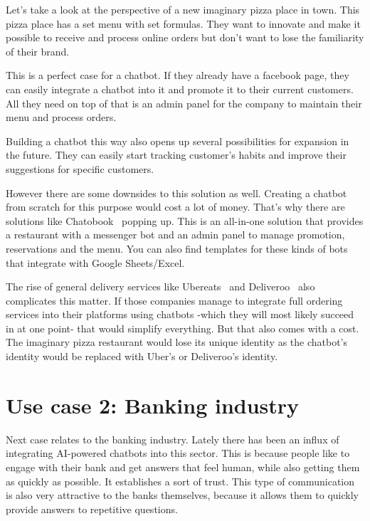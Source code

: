 Let's take a look at the perspective of a new imaginary pizza place in town. This pizza place has a set menu with set formulas. They want to innovate and make it possible to receive and process online orders but don't want to lose the familiarity of their brand.

This is a perfect case for a chatbot. If they already have a facebook page, they can easily integrate a chatbot into it and promote it to their current customers. All they need on top of that is an admin panel for the company to maintain their menu and process orders.

Building a chatbot this way also opens up several possibilities for expansion in the future. They can easily start tracking customer's habits and improve their suggestions for specific customers.

However there are some downsides to this solution as well. Creating a chatbot from scratch for this purpose would cost a lot of money. That's why there are solutions like Chatobook~\cite{chatobook} popping up. This is an all-in-one solution that provides a restaurant with a messenger bot and an admin panel to manage promotion, reservations and the menu. You can also find templates for these kinds of bots that integrate with Google Sheets/Excel.~\cite{chatbot-templates-pizza}

The rise of general delivery services like Ubereats~\cite{ubereats} and Deliveroo~\cite{deliveroo} also complicates this matter. If those companies manage to integrate full ordering services into their platforms using chatbots -which they will most likely succeed in at one point- that would simplify everything. But that also comes with a cost. The imaginary pizza restaurant would lose its unique identity as the chatbot's identity would be replaced with Uber's or Deliveroo's identity.

\section{Use case 2: Banking industry}

Next case relates to the banking industry. Lately there has been an influx of integrating AI-powered chatbots into this sector. This is because people like to engage with their bank and get answers that feel human, while also getting them as quickly as possible. It establishes a sort of trust. This type of communication is also very attractive to the banks themselves, because it allows them to quickly provide answers to repetitive questions.

